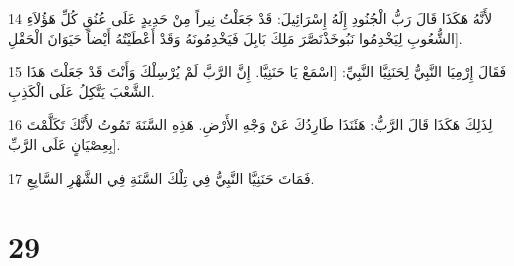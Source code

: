 \par 14 لأَنَّهُ هَكَذَا قَالَ رَبُّ الْجُنُودِ إِلَهُ إِسْرَائِيلَ: قَدْ جَعَلْتُ نِيراً مِنْ حَدِيدٍ عَلَى عُنُقِ كُلِّ هَؤُلاَءِ الشُّعُوبِ لِيَخْدِمُوا نَبُوخَذْنَصَّرَ مَلِكَ بَابِلَ فَيَخْدِمُونَهُ وَقَدْ أَعْطَيْتُهُ أَيْضاً حَيَوَانَ الْحَقْلِ].
\par 15 فَقَالَ إِرْمِيَا النَّبِيُّ لِحَنَنِيَّا النَّبِيِّ: [اسْمَعْ يَا حَنَنِيَّا. إِنَّ الرَّبَّ لَمْ يُرْسِلْكَ وَأَنْتَ قَدْ جَعَلْتَ هَذَا الشَّعْبَ يَتَّكِلُ عَلَى الْكَذِبِ.
\par 16 لِذَلِكَ هَكَذَا قَالَ الرَّبُّ: هَئَنَذَا طَارِدُكَ عَنْ وَجْهِ الأَرْضِ. هَذِهِ السَّنَةَ تَمُوتُ لأَنَّكَ تَكَلَّمْتَ بِعِصْيَانٍ عَلَى الرَّبِّ].
\par 17 فَمَاتَ حَنَنِيَّا النَّبِيُّ فِي تِلْكَ السَّنَةِ فِي الشَّهْرِ السَّابِعِ.

\chapter{29}


